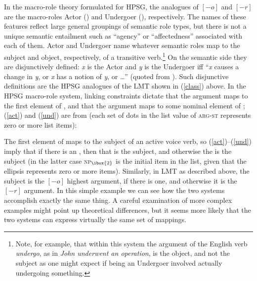 \noindent
In the macro-role theory formulated for HPSG, the analogues of $[-o]$ and $[-r]$ are the macro-roles Actor () and Undergoer (), respectively.  The names of these features reflect large general groupings of semantic role types, but there is not a unique semantic entailment such as ``agency'' or ``affectedness'' associated with each of them.  Actor  and Undergoer  name whatever semantic roles map to the subject and object, respectively, of a transitive verb.\footnote{Note, for example, that within this system the  argument of the English verb \textit{undergo}, as in \textit{John underwent an operation}, is the object, and not the subject as one might expect if being an Undergoer involved actually undergoing something.}  On the semantic side they are disjunctively defined: \textit{x} is the Actor and \textit{y} is the Undergoer iff ``\textit{x} causes a change in \textit{y}, or \textit{x} has a notion of \textit{y}, or \ldots '' (quoted from \crossrefchapteralt[\pageref{def-act-und-rel}]{arg-st}).  Such disjunctive definitions are the HPSG analogues of the LMT  shown in (\ref{class}) above.   In the HPSG macro-role system, linking constraints dictate that the  argument maps to the first element of , and that the  argument maps to some nominal element of ; (\ref{act}) and (\ref{und}) are from   
(each set of dots in the list value of \textsc{arg-st} represents zero or more list items):

\ea
\label{act}
\z

\ea
\label{und}
\z
The first element of  maps to the subject of an active voice verb, so (\ref{act})--(\ref{und}) imply that if there is an , then that  is the subject, and otherwise the  is the subject (in the latter case \textsc{np}$_{\ibox{2}}$ is the initial item in the list, given that the ellipsis represents zero or more items).  Similarly, in LMT as described above, the subject is the $[-o]$ highest argument, if there is one, and otherwise it is the $[-r]$ argument.  In this simple example we can see how the two systems accomplish exactly the same thing.  A careful examination of more complex examples might point up theoretical differences, but it seems more likely that the two systems can express virtually the same set of mappings.  

